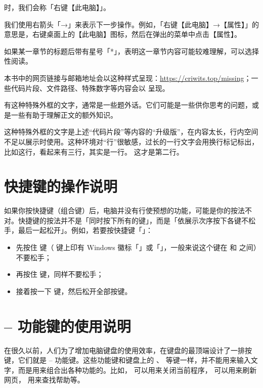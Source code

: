 \noindent 时，我们会称「右键【此电脑】」。

我们使用右箭头「→」来表示下一步操作。例如，「右键【此电脑】→【属性】」的意思是，右键桌面上的【此电脑】图标，然后在弹出的菜单中点击【属性】。

如果某一章节的标题后带有星号「*」，表明这一章节内容可能较难理解，可以选择性阅读。

本书中的网页链接与邮箱地址会以这种样式呈现：\url{https://criwits.top/missing}；一些代码片段、文件路径、特殊数字等内容会以  呈现。

\begin{note}
  有这种特殊外框的文字，通常是一些题外话。它们可能是一些供你思考的问题，或是一些有助于理解正文的额外知识。
\end{note}

\begin{MissingVerbatim}
这种特殊外框的文字是上述“代码片段”等内容的“升级版”，在内容太长，行内空间不足以展示时使用。这种环境对“行”很敏感，过长的一行文字会用换行标记标出，比如这行，看起来有三行，其实是一行。
这才是第二行。
\end{MissingVerbatim}

\section{快捷键的操作说明}

如果你按快捷键（组合键）后，电脑并没有行使预想的功能，可能是你的按法不对。快捷键的按法并不是「同时按下所有的键」，而是「依展示次序按下各键不松手，最后一起松开」。例如，若要按快捷键「」：

\begin{itemize}
  \item 先按住 \keys{\Windows} 键（\keys{\Windows} 键上印有 Windows 徽标「\Windows」或「\WindowsTen」，一般来说这个键在  和  之间）不要松手；
  \item 再按住  键，同样不要松手；
  \item 接着按一下  键，然后松开全部按键。
\end{itemize}

\section{ --  功能键的使用说明}

在很久以前，人们为了增加电脑键盘的使用效率，在键盘的最顶端设计了一排按键，它们就是  --  功能键。这些功能键和键盘上的 、 等键一样，并不能用来输入文字，而是用来组合出各种功能的。比如， 可以用来关闭当前程序， 可以用来刷新网页， 用来查找帮助等。


